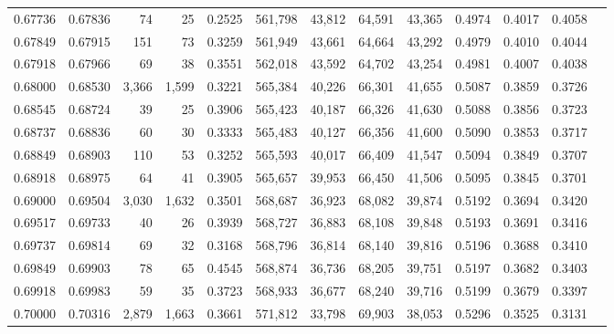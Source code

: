 \begin{tabular}{rrrrrrrrrrrrr}
0.67736 & 0.67836 &     74 &    25 &                                     0.2525 & 561,798 &  43,812 &  64,591 &  43,365 & 0.4974 & 0.4017 & 0.4058 \\
0.67849 & 0.67915 &    151 &    73 &                                     0.3259 & 561,949 &  43,661 &  64,664 &  43,292 & 0.4979 & 0.4010 & 0.4044 \\
0.67918 & 0.67966 &     69 &    38 &                                     0.3551 & 562,018 &  43,592 &  64,702 &  43,254 & 0.4981 & 0.4007 & 0.4038 \\
0.68000 & 0.68530 &  3,366 & 1,599 &                                     0.3221 & 565,384 &  40,226 &  66,301 &  41,655 & 0.5087 & 0.3859 & 0.3726 \\
0.68545 & 0.68724 &     39 &    25 &                                     0.3906 & 565,423 &  40,187 &  66,326 &  41,630 & 0.5088 & 0.3856 & 0.3723 \\
0.68737 & 0.68836 &     60 &    30 &                                     0.3333 & 565,483 &  40,127 &  66,356 &  41,600 & 0.5090 & 0.3853 & 0.3717 \\
0.68849 & 0.68903 &    110 &    53 &                                     0.3252 & 565,593 &  40,017 &  66,409 &  41,547 & 0.5094 & 0.3849 & 0.3707 \\
0.68918 & 0.68975 &     64 &    41 &                                     0.3905 & 565,657 &  39,953 &  66,450 &  41,506 & 0.5095 & 0.3845 & 0.3701 \\
0.69000 & 0.69504 &  3,030 & 1,632 &                                     0.3501 & 568,687 &  36,923 &  68,082 &  39,874 & 0.5192 & 0.3694 & 0.3420 \\
0.69517 & 0.69733 &     40 &    26 &                                     0.3939 & 568,727 &  36,883 &  68,108 &  39,848 & 0.5193 & 0.3691 & 0.3416 \\
0.69737 & 0.69814 &     69 &    32 &                                     0.3168 & 568,796 &  36,814 &  68,140 &  39,816 & 0.5196 & 0.3688 & 0.3410 \\
0.69849 & 0.69903 &     78 &    65 &                                     0.4545 & 568,874 &  36,736 &  68,205 &  39,751 & 0.5197 & 0.3682 & 0.3403 \\
0.69918 & 0.69983 &     59 &    35 &                                     0.3723 & 568,933 &  36,677 &  68,240 &  39,716 & 0.5199 & 0.3679 & 0.3397 \\
0.70000 & 0.70316 &  2,879 & 1,663 &                                     0.3661 & 571,812 &  33,798 &  69,903 &  38,053 & 0.5296 & 0.3525 & 0.3131 \\

\end{tabular}
